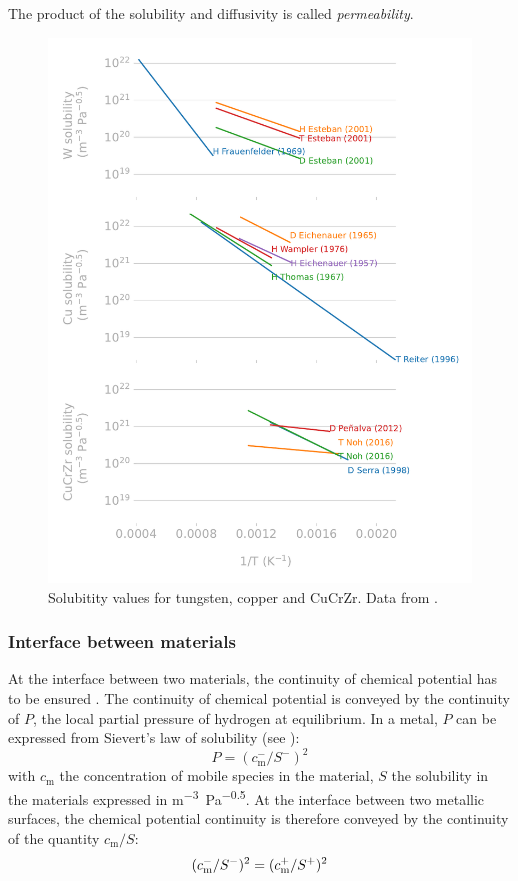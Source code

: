 The product of the solubility and diffusivity is called \textit{permeability}.

\begin{figure}
    \centering
    \includegraphics[width=0.75\linewidth]{Figures/Chapter1/materials_solubility_review_comparison.pdf}
    \caption{Solubitity values for tungsten, copper and CuCrZr. Data from \cite{delaporte-mathurin_remdelaportemathurinh-transport-materials_2022}.}
\end{figure}

\subsubsection{Interface between materials}
At the interface between two materials, the continuity of chemical potential has to be ensured .
The continuity of chemical potential is conveyed by the continuity of $P$, the local partial pressure of hydrogen at equilibrium.
In a metal, $P$ can be expressed from Sievert's law of solubility (see ):
\begin{equation}
    P = (c_\mathrm{m}^-/S^-)^2
\end{equation}
with $c_\mathrm{m}$ the concentration of mobile species in the material, $S$ the solubility in the materials expressed in \si{m^{-3}.Pa^{-0.5}}.
At the interface between two metallic surfaces, the chemical potential continuity is therefore conveyed by the continuity of the quantity $c_\mathrm{m}/S$:
\begin{equation}
    (c_\mathrm{m}^-/S^-)^2 = (c_\mathrm{m}^+/S^+)^2
    \labeq{c/s conservation}
\end{equation}

